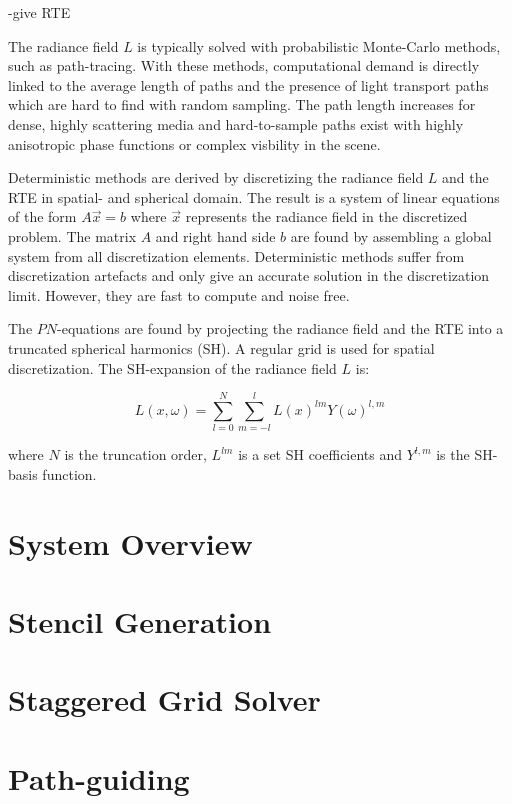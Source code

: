 -give RTE


The radiance field $L$ is typically solved with probabilistic Monte-Carlo methods, such as path-tracing. With these methods, computational demand is directly linked to the average length of paths and the presence of light transport paths which are hard to find with random sampling. The path length increases for dense, highly scattering media and hard-to-sample paths exist with highly anisotropic phase functions or complex visbility in the scene.

Deterministic methods are derived by discretizing the radiance field $L$ and the RTE in spatial- and spherical domain. The result is a system of linear equations of the form $A\vec{x}=b$ where $\vec{x}$ represents the radiance field in the discretized problem. The matrix $A$ and right hand side $b$ are found by assembling a global system from all discretization elements. Deterministic methods suffer from discretization artefacts and only give an accurate solution in the discretization limit. However, they are fast to compute and noise free.

The $PN$-equations are found by projecting the radiance field and the RTE into a truncated spherical harmonics (SH). A regular grid is used for spatial discretization. The SH-expansion of the radiance field $L$ is:

\begin{equation}
L\left(x, \omega \right) = \sum_{l=0}^{N}
\sum_{m=-l}^{l}
L\left(x\right)^{lm}
Y\left(\omega\right)^{l,m}
\end{equation}

where $N$ is the truncation order, $L^{lm}$ is a set SH coefficients and $Y^{l,m}$ is the SH-basis function.



\section{System Overview}
\section{Stencil Generation}
\section{Staggered Grid Solver}
\section{Path-guiding}
